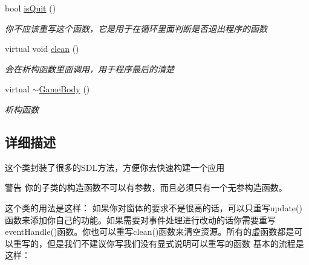 \begin{DoxyCompactItemize}
bool \mbox{\hyperlink{class_game_body_a9ec4c012ae72dd25d849d6ebacb9357c}{is\+Quit}} ()
\begin{DoxyCompactList}\small\item\em 你不应该重写这个函数，它是用于在循环里面判断是否退出程序的函数 \end{DoxyCompactList}\item 
virtual void \mbox{\hyperlink{class_game_body_a804c0e5d53cf79d8b4262ece694be204}{clean}} ()
\begin{DoxyCompactList}\small\item\em 会在析构函数里面调用，用于程序最后的清楚 \end{DoxyCompactList}\item 
virtual \mbox{\hyperlink{class_game_body_af13feb5fae1c033d524dae6210dd58ef}{$\sim$\+Game\+Body}} ()
\begin{DoxyCompactList}\small\item\em 析构函数 \end{DoxyCompactList}\end{DoxyCompactItemize}


\subsection{详细描述}
这个类封装了很多的\+S\+D\+L方法，方便你去快速构建一个应用 

\begin{DoxyWarning}{警告}
你的子类的构造函数不可以有参数，而且必须只有一个无参构造函数。
\end{DoxyWarning}
这个类的用法是这样： 如果你对窗体的要求不是很高的话，可以只重写update()函数来添加你自己的功能。如果需要对事件处理进行改动的话你需要重写event\+Handle()函数。你也可以重写clean()函数来清空资源。所有的虚函数都是可以重写的，但是我们不建议你写我们没有显式说明可以重写的函数 基本的流程是这样： 
\begin{DoxyCode}{0}
\DoxyCodeLine{        \textcolor{comment}{//TODO Initialize....}}
\DoxyCodeLine{    \}}
\DoxyCodeLine{ \textcolor{comment}{//TODO Other Override....}}
\DoxyCodeLine{\};}
\DoxyCodeLine{ }
\DoxyCodeLine{\}}
\end{DoxyCode}
 

